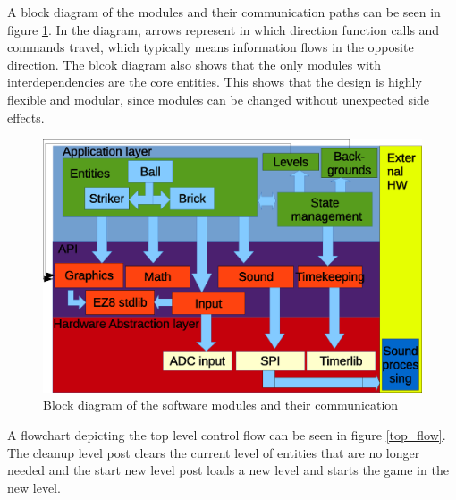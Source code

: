 A block diagram of the modules and their communication paths can be seen in figure \ref{architecture_block}. In the
diagram, arrows represent in which direction function calls and commands travel, which typically means information
flows in the opposite direction. The blcok diagram also shows that the only modules with interdependencies are
the core entities. This shows that the design is highly flexible and modular, since modules can be changed without 
unexpected side effects. \\

\begin{figure}
	\center
	\includegraphics[scale=0.7]{pictures/architecture_block.eps}
	\caption{Block diagram of the software modules and their communication}
	\label{architecture_block}
\end{figure}

A flowchart depicting the top level control flow can be seen in figure \ref{top_flow}. The cleanup level post clears
the current level of entities that are no longer needed and the start new level post loads a new level and starts
 the game in the new level. \\

